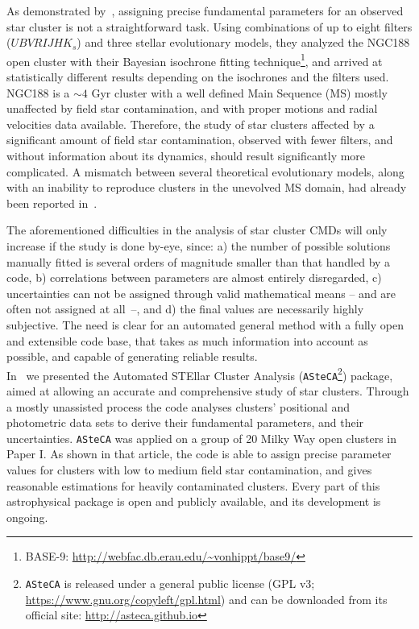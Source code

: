 \documentclass[draft]{aa}
\begin{document}
As demonstrated by~\cite{Hills_2015}, assigning precise fundamental
parameters for an observed star cluster is not a straightforward task.
Using combinations of up to eight filters ($UBVRIJHK_s$) and three stellar
evolutionary models, they analyzed the NGC188 open cluster with their
Bayesian isochrone fitting technique\footnote{BASE-9: 
\url{http://webfac.db.erau.edu/~vonhippt/base9/}}, and arrived at statistically
different results depending on the isochrones and the filters used.
%
NGC188 is a ${\sim}4$ Gyr cluster with a well defined Main Sequence (MS) mostly
unaffected by field star contamination, and with proper motions and radial
velocities data available.
Therefore, the study of star clusters affected by a significant amount of field
star contamination, observed with fewer filters, and without information about
its dynamics, should result significantly more complicated.
%
A mismatch between several theoretical evolutionary models, along with an
inability to reproduce clusters in the unevolved MS domain, had already
been reported in~\cite{Grocholski_2003}.

The aforementioned difficulties in the analysis of star cluster CMDs will only
increase if the study is done by-eye, since: a) the number of possible solutions
manually fitted is several orders of magnitude smaller than that handled by a
code, b) correlations between parameters are almost entirely disregarded, c)
uncertainties can not be assigned through valid mathematical
means -- and are often not assigned at \mbox{all --}, and d) the final values
are necessarily highly subjective.
%
The need is clear for an automated general method with a fully open and
extensible code base, that takes as much information into account as possible,
and capable of generating reliable results.\\

In~\citet[][hereafter Paper I]{Perren_2015} we presented the Automated STEllar
Cluster Analysis (\texttt{ASteCA}\footnote{\texttt{ASteCA} is released under a
general public license (GPL v3; \url{https://www.gnu.org/copyleft/gpl.html}) and
can be downloaded from its official site: \url{http://asteca.github.io}})
package, aimed at allowing an accurate and comprehensive study of star clusters.
%
Through a mostly unassisted process the code analyses clusters' positional
and photometric data sets to derive their fundamental parameters, and their
uncertainties.
\texttt{ASteCA} was applied on a group of 20 Milky Way open clusters
in Paper I. As shown in that article, the code is able to assign precise
parameter values for clusters with low to medium field star contamination, and
gives reasonable estimations for heavily contaminated clusters.
Every part of this astrophysical package is open and publicly available, and its
development is ongoing.
\end{document}
